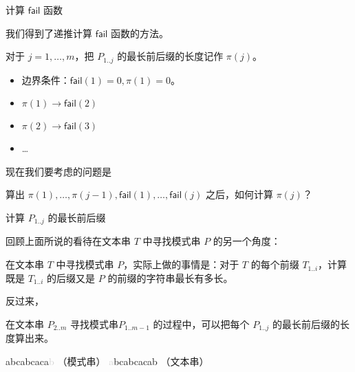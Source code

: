 \documentclass{ctexbeamer}
\newcommand{\lightgray}[1]{\textcolor{lightgray}{#1}}
\newcommand{\fail}{\mathsf{fail}}
\begin{document}
\begin{frame}{计算 $\fail$ 函数}

我们得到了递推计算 $\fail$ 函数的方法。

对于 $j = 1, \dots, m$，把 $P_{1..j}$ 的最长前后缀的长度记作 $\pi(j)$。
\begin{itemize}
    \item 边界条件：$\fail(1) = 0, \pi(1) = 0$。
    \item $\pi(1) \to \fail(2)$
    \item $\pi(2) \to \fail(3)$
    \item \dots
\end{itemize}

现在我们要考虑的问题是

\begin{tcolorbox}
  算出 $\pi(1), \dots, \pi(j - 1), \fail(1), \dots, \fail(j)$ 之后，如何计算 $\pi(j)$？
\end{tcolorbox}
\end{frame}


\begin{frame}[fragile]{计算 $P_{1..j}$ 的最长前后缀}

  回顾上面所说的看待在文本串 $T$ 中寻找模式串 $P$ 的另一个角度：
  
  \begin{tcolorbox}
    在文本串 $T$ 中寻找模式串 $P$，实际上做的事情是：对于 $T$ 的每个前缀 $T_{1..i}$，计算既是 $T_{1..i}$ 的后缀又是 $P$ 的前缀的字符串最长有多长。
  \end{tcolorbox}
  
  反过来，
  \begin{tcolorbox}
    在文本串 $P_{2..m}$ 寻找模式串$P_{1..m-1}$ 的过程中，可以把每个 $P_{1..j}$ 的最长前后缀的长度算出来。
    \tcblower
\begin{tverb}
 abcabcaca\lightgray{b}   （模式串）
\lightgray{a}bcabcacab    （文本串）
\end{tverb}
  \end{tcolorbox}
\end{frame}
\end{document}
